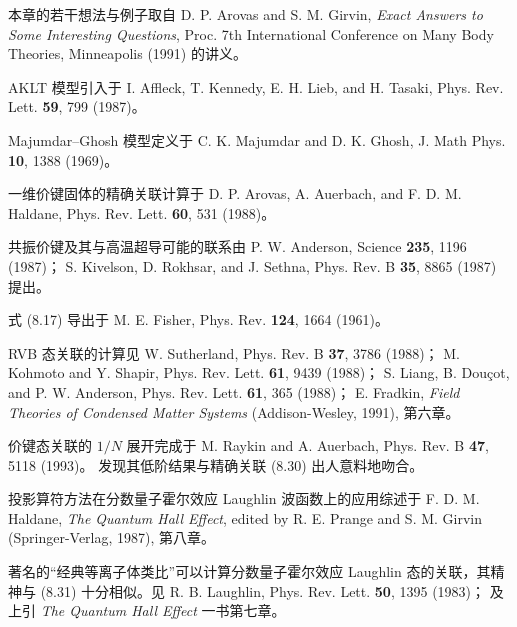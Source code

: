 \begin{chapbib}
\item 本章的若干想法与例子取自
  D. P. Arovas and S. M. Girvin, \textit{Exact Answers to Some Interesting Questions}, Proc. 7th International Conference on Many Body Theories, Minneapolis (1991) 的讲义。
\item AKLT 模型引入于
  I. Affleck, T. Kennedy, E. H. Lieb, and H. Tasaki, Phys. Rev. Lett. \textbf{59}, 799 (1987)。
\item Majumdar--Ghosh 模型定义于
  C. K. Majumdar and D. K. Ghosh, J. Math Phys. \textbf{10}, 1388 (1969)。
\item 一维价键固体的精确关联计算于
  D. P. Arovas, A. Auerbach, and F. D. M. Haldane, Phys. Rev. Lett. \textbf{60}, 531 (1988)。
\item 共振价键及其与高温超导可能的联系由
  P. W. Anderson, Science \textbf{235}, 1196 (1987)；
  S. Kivelson, D. Rokhsar, and J. Sethna, Phys. Rev. B \textbf{35}, 8865 (1987)
  提出。
\item 式 (8.17) 导出于
  M. E. Fisher, Phys. Rev. \textbf{124}, 1664 (1961)。
\item RVB 态关联的计算见
  W. Sutherland, Phys. Rev. B \textbf{37}, 3786 (1988)；
  M. Kohmoto and Y. Shapir, Phys. Rev. Lett. \textbf{61}, 9439 (1988)；
  S. Liang, B. Douçot, and P. W. Anderson, Phys. Rev. Lett. \textbf{61}, 365 (1988)；
  E. Fradkin, \textit{Field Theories of Condensed Matter Systems} (Addison-Wesley, 1991), 第六章。
\item 价键态关联的 $1/N$ 展开完成于
  M. Raykin and A. Auerbach, Phys. Rev. B \textbf{47}, 5118 (1993)。
  发现其低阶结果与精确关联 (8.30) 出人意料地吻合。
\item 投影算符方法在分数量子霍尔效应 Laughlin 波函数上的应用综述于
  F. D. M. Haldane, \textit{The Quantum Hall Effect}, edited by R. E. Prange and S. M. Girvin (Springer-Verlag, 1987), 第八章。
\item 著名的“经典等离子体类比”可以计算分数量子霍尔效应 Laughlin 态的关联，其精神与 (8.31) 十分相似。见
  R. B. Laughlin, Phys. Rev. Lett. \textbf{50}, 1395 (1983)；
  及上引 \textit{The Quantum Hall Effect} 一书第七章。
\end{chapbib}
